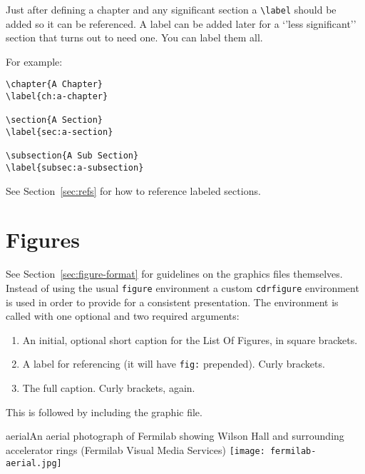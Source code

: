 Just after defining a chapter and any significant section a
\verb|\label| should be added so it can be referenced.
A label can be added later for a `'less significant'' section that
turns out to need one. You can label them all. 

For example:

\begin{verbatim}
\chapter{A Chapter}
\label{ch:a-chapter}

\section{A Section}
\label{sec:a-section}

\subsection{A Sub Section}
\label{subsec:a-subsection}
\end{verbatim}

See Section~\ref{sec:refs} for how to reference labeled sections.

\FloatBarrier
\section{Figures}
\label{sec:figures}

See Section~\ref{sec:figure-format} for guidelines on the graphics files themselves.
Instead of using the usual \texttt{figure} environment a custom \texttt{cdrfigure}
environment is used in order to provide for a consistent presentation.
The environment is called with one optional and two required
arguments:

\begin{enumerate}
\item An initial, optional short caption for the List Of Figures, in square brackets.
\item A label for referencing (it will have \texttt{fig:} prepended). Curly brackets.
\item The full caption. Curly brackets, again.
\end{enumerate}

This is followed by including the graphic file.

\begin{cdrfigure}{aerial}{An aerial photograph of Fermilab
    showing Wilson Hall and surrounding accelerator rings (Fermilab
    Visual Media Services)}
  \texttt{[image: fermilab-aerial.jpg]}
\end{cdrfigure}


